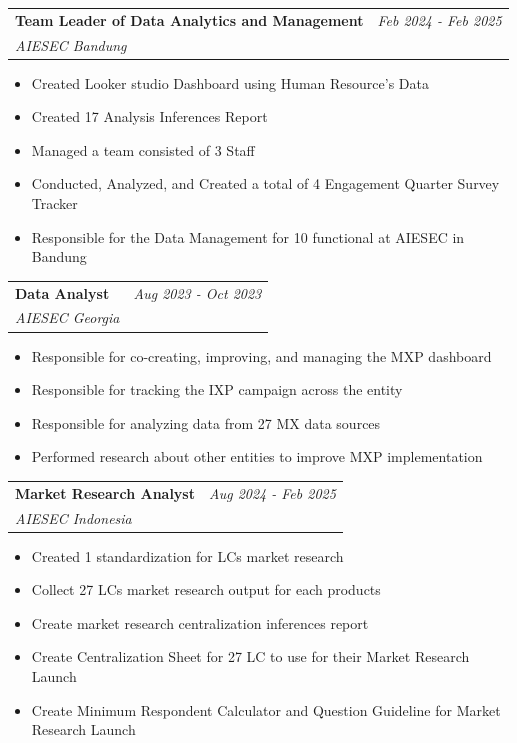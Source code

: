 \documentclass[a4paper,11pt]{article}
\makeatletter
\newcommand{\resumeSubheading}[4]{
\vspace{0.5mm}\item
    \begin{tabular*}{0.98\textwidth}[t]{l@{\extracolsep{\fill}}r}
        \textbf{#1} & \textit{\footnotesize{#4}} \\
        \textit{\footnotesize{#3}} &  \footnotesize{#2}\\
    \end{tabular*}
    \vspace{-2.4mm}
}
\newcommand{\resumeItemListStart}{\begin{justify}\begin{itemize}[leftmargin=3ex, rightmargin=2ex, noitemsep,labelsep=1.2mm,itemsep=0mm]\small}
\newcommand{\resumeItemListEnd}{\end{itemize}\end{justify}\vspace{-2mm}}
\makeatother
\begin{document}
    \resumeSubheading
      {Team Leader of Data Analytics and Management}{}
      {AIESEC Bandung}{Feb 2024 - Feb 2025}
      \vspace{-2.0mm}
      
      \resumeItemListStart
    \item {Created Looker studio Dashboard using Human Resource's Data}
    \item {Created 17 Analysis Inferences Report}
    \item {Managed a team consisted of 3 Staff}
    \item {Conducted, Analyzed, and Created a total of 4 Engagement Quarter Survey Tracker}
    \item {Responsible for the Data Management for 10 functional at AIESEC in Bandung}
    \resumeItemListEnd
    
    \vspace{-3.0mm}

    \resumeSubheading
      {Data Analyst}{}
      {AIESEC Georgia}{Aug 2023 - Oct 2023}
      \vspace{-2.0mm}
      
      \resumeItemListStart
    \item {Responsible for co-creating, improving, and managing the MXP dashboard}
    \item {Responsible for tracking the IXP campaign across the entity}
    \item {Responsible for analyzing data from 27 MX data sources}
    \item {Performed research about other entities to improve MXP implementation}
    \resumeItemListEnd
    
    \vspace{-3.0mm}

    \resumeSubheading
      {Market Research Analyst}{}
      {AIESEC Indonesia}{Aug 2024 - Feb 2025}
      \vspace{-2.0mm}
      
      \resumeItemListStart
    \item {Created 1 standardization for LCs market research}
    \item {Collect 27 LCs market research output for each products}
    \item {Create market research centralization inferences report}
    \item {Create Centralization Sheet for 27 LC to use for their Market Research Launch}
    \item {Create Minimum Respondent Calculator and Question Guideline for Market Research Launch}
    \resumeItemListEnd
    
\end{document}
